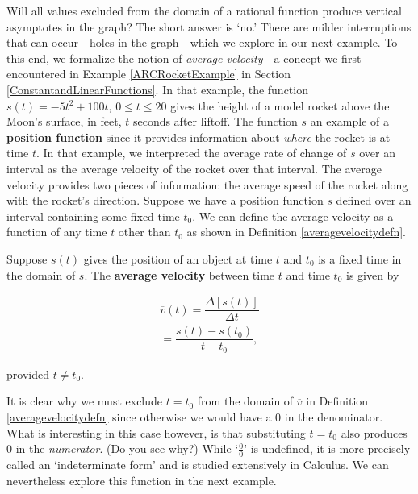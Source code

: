 \begin{ex}
Will all  values excluded from the domain of a rational function produce vertical asymptotes in the graph?  The short answer is `no.'  There are milder interruptions that can occur - holes in the graph - which we explore in our next example.  To this end, we formalize the notion of \textit{average velocity} - a concept we first encountered in  Example \ref{ARCRocketExample} in Section \ref{ConstantandLinearFunctions}. In that example, the function $s(t) = -5t^2+100t$, $0 \leq t \leq 20$ gives the height of a model rocket above the Moon's surface, in feet,  $t$ seconds after liftoff.  The function $s$ an example of a \textbf{position function} since it provides information about \textit{where} the rocket is at time $t$.   In that example, we interpreted the average rate of change of $s$ over an interval as the average velocity of the rocket over that interval.  The average velocity provides two pieces of information:  the average speed of the rocket along with the rocket's direction.  Suppose we have a position function $s$ defined over an interval containing some fixed time $t_{0}$.  We can define the average velocity as a function of any time $t$ other than $t_{0}$ as shown in Definition \ref{averagevelocitydefn}.

\begin{mdefn}
\label{averagevelocitydefn} Suppose $s(t)$ gives the position of an object at time $t$ and $t_{0}$ is a fixed time in the domain of $s$.  The \textbf{average velocity} between time $t$ and time $t_{0}$ is given by

\begin{multline*}
   \overline{v}(t) = \dfrac{\Delta [s(t)]}{\Delta t} \\
  = \dfrac{s(t) - s(t_{0})}{t - t_{0}},
\end{multline*}

provided $t \neq t_{0}$.

\end{mdefn}

It is clear why we must exclude $t = t_{0}$ from the domain of $\overline{v}$ in Definition \ref{averagevelocitydefn} since otherwise we would have a $0$ in the denominator.  What is interesting in this case however, is that substituting $t = t_{0}$ also produces $0$ in the \textit{numerator}. (Do you see why?)  While `$\frac{0}{0}$' is undefined, it is more precisely called an `indeterminate form' and is studied extensively in Calculus.  We can nevertheless explore this function in the next example.


\end{ex}
